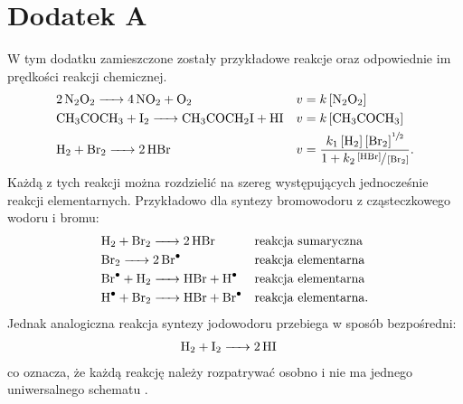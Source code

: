 \documentclass[10pt, a4paper, twoside, onecolumn]{article}
\numberwithin{equation}{section}
\begin{document}
	\section*{Dodatek A}\label{sec: dodatek A}
	W tym dodatku zamieszczone zostały przykładowe reakcje oraz odpowiednie im prędkości reakcji chemicznej. 
	\begin{align*}
		&\ce{2N2O2 -> 4NO2 + O2} &&v=k\left[\ce{N2O2}\right] \\
		&\ce{CH3COCH3 + I2 -> CH3COCH2I + HI} &&v=k\left[\ce{CH3COCH3}\right] \\
		&\ce{H2 + Br2 -> 2HBr} &&v=\frac{k_{1}\left[\ce{H2}\right]\left[\ce{Br2}\right]^{\sfrac{1}{2}}}{1+k_{2}\sfrac{\left[\ce{HBr}\right]}{\left[\ce{Br2}\right]}}.
	\end{align*}
	Każdą z tych reakcji można rozdzielić na szereg występujących jednocześnie reakcji elementarnych. Przykładowo dla syntezy bromowodoru z cząsteczkowego wodoru i bromu:
	\begin{align*}
		&\ce{H2 + Br2 -> 2HBr} &&\text{reakcja sumaryczna} \\
		&\ce{Br2 -> 2Br^{.}} &&\text{reakcja elementarna} \\
		&\ce{Br^{.} + H2 -> HBr + H^{.}} &&\text{reakcja elementarna} \\
		&\ce{H^{.} + Br2 -> HBr + Br^{.}} &&\text{reakcja elementarna}.
	\end{align*}
	Jednak analogiczna reakcja syntezy jodowodoru przebiega w sposób bezpośredni: 
	\begin{align*}
		&\ce{H2 + I2 -> 2HI}
	\end{align*}
	co oznacza, że każdą reakcję należy rozpatrywać osobno i nie ma jednego uniwersalnego schematu \cite{pigon1}.
	
\end{document}
